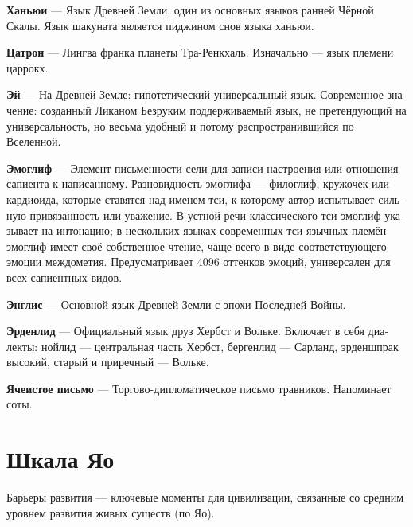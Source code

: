 \documentclass[a4paper,12pt,fleqn]{book}\usepackage{cooltooltips}\usepackage{polyglossia}\setdefaultlanguage[babelshorthands=true]{russian}\setotherlanguage{english}\defaultfontfeatures{Ligatures=TeX,Mapping=tex-text} \usepackage{xcolor}\definecolor{lightgray}{HTML}{bbbbbb}\color{lightgray}\newcommand{\ml}[3]{\textenglish{\textcolor{black}{#3}}}
\newcommand{\theterm}[3]{\textbf{\hypertarget{#1}{#2}} --- #3}
\begin{document}
\theterm{hanyui}
{Ханьюи}
{Язык Древней Земли, один из основных языков ранней Чёрной Скалы.
Язык шакуната является пиджином снов языка ханьюи.}

\theterm{tesatron}
{Цатрон}
{Лингва франка планеты Тра-Ренкхаль.
Изначально --- язык племени царрокх.}

\theterm{ej}
{Эй}
{На Древней Земле: гипотетический универсальный язык.
Современное значение: созданный Ликаном Безруким поддерживаемый язык, не претендующий на универсальность, но весьма удобный и потому распространившийся по Вселенной.}

\theterm{emoglyph}
{Эмоглиф}
{Элемент письменности сели для записи настроения или отношения сапиента к написанному.
Разновидность эмоглифа --- филоглиф, кружочек или кардиоида, которые ставятся над именем тси, к которому автор испытывает сильную привязанность или уважение.
В устной речи классического тси эмоглиф указывает на интонацию;
в нескольких языках современных тси-язычных племён эмоглиф имеет своё собственное чтение, чаще всего в виде соответствующего эмоции междометия.
Предусматривает 4096 оттенков эмоций, универсален для всех сапиентных видов.}

\theterm{englis}
{Энглис}
{Основной язык Древней Земли с эпохи Последней Войны.}

\theterm{erdenlied}
{Эрденлид}
{Официальный язык друз Хербст и Вольке.
Включает в себя диалекты: нойлид --- центральная часть Хербст, бергенлид --- Сарланд, эрденшпрак высокий, старый и приречный --- Вольке.}

\theterm{cell-script}
{Ячеистое письмо}
{Торгово-дипломатическое письмо травников.
Напоминает соты.}

\chapter{Шкала Яо}

Барьеры развития --- ключевые моменты для цивилизации, связанные со средним уровнем развития живых существ (по Яо).
\end{document}
